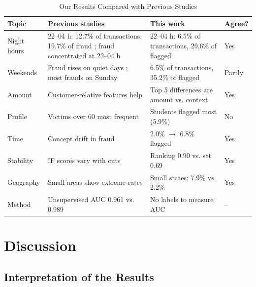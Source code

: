 \documentclass[journal]{IEEEtran}
\begin{document}
\begin{table}[!t]
\renewcommand{\arraystretch}{1.15}
\caption{Our Results Compared with Previous Studies}
\label{tab:comparison}
\centering
\footnotesize
\begin{tabular}{p{}p{}p{}p{}}
\hline
\textbf{Topic} & \textbf{Previous studies} & \textbf{This work} & \textbf{Agree?} \\
\hline
Night hours & 22--04 h: 12.7\% of transactions, 19.7\% of fraud \cite{accertify2026cyber}; fraud concentrated at 22--04 h \cite{afriyie2023supervised} & 22--04 h: 6.5\% of transactions, 29.6\% of flagged & Yes \\
Weekends & Fraud rises on quiet days \cite{woodward2017stripe}; most frauds on Sunday \cite{afriyie2023supervised} & 6.5\% of transactions, 35.2\% of flagged & Partly \\
Amount & Customer-relative features help \cite{whitrow2009aggregation,bahnsen2016feature} & Top 5 differences are amount vs. context & Yes \\
Profile & Victims over 60 most frequent \cite{afriyie2023supervised} & Students flagged most (5.9\%) & No \\
Time & Concept drift in fraud \cite{dalpozzolo2018realistic,gama2014survey} & 2.0\% $\rightarrow$ 6.8\% flagged & Yes \\
Stability & IF scores vary with cuts \cite{hariri2021extended} & Ranking 0.90 vs. set 0.69 & Yes \\
Geography & Small areas show extreme rates \cite{wainer2007dangerous} & Small states: 7.9\% vs. 2.2\% & Yes \\
Method & Unsupervised AUC 0.961 vs. 0.989 \cite{niu2019comparison} & No labels to measure AUC & -- \\
\hline
\end{tabular}
\end{table}


\section{Discussion}

\subsection{Interpretation of the Results}
\end{document}
